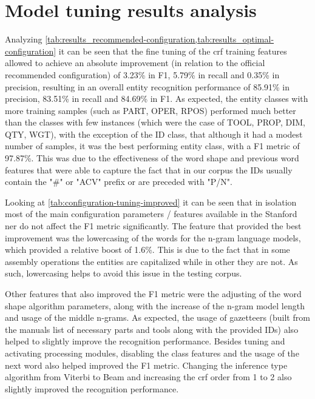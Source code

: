 \section{Model tuning results analysis}\label{sec:model-tuning-results}

Analyzing \cref{tab:results_recommended-configuration,tab:results_optimal-configuration} it can be seen that the fine tuning of the \gls{crf} training features allowed to achieve an absolute improvement (in relation to the official recommended configuration) of 3.23\% in F1, 5.79\% in recall and 0.35\% in precision, resulting in an overall entity recognition performance of 85.91\% in precision, 83.51\% in recall and 84.69\% in F1. As expected, the entity classes with more training samples (such as PART, OPER, RPOS) performed much better than the classes with few instances (which were the case of TOOL, PROP, DIM, QTY, WGT), with the exception of the ID class, that although it had a modest number of samples, it was the best performing entity class, with a F1 metric of 97.87\%. This was due to the effectiveness of the word shape and previous word features that were able to capture the fact that in our corpus the IDs usually contain the "\#" or "ACV" prefix or are preceded with "P/N".

Looking at \cref{tab:configuration-tuning-improved} it can be seen that in isolation most of the main configuration parameters / features available in the Stanford \gls{ner} do not affect the F1 metric significantly. The feature that provided the best improvement was the lowercasing of the words for the n-gram language models, which provided a relative boost of 1.6\%. This is due to the fact that in some assembly operations the entities are capitalized while in other they are not. As such, lowercasing helps to avoid this issue in the testing corpus.

Other features that also improved the F1 metric were the adjusting of the word shape algorithm parameters, along with the increase of the n-gram model length and usage of the middle n-grams. As expected, the usage of gazetteers (built from the manuals list of necessary parts and tools along with the provided IDs) also helped to slightly improve the recognition performance. Besides tuning and activating processing modules, disabling the class features and the usage of the next word also helped improved the F1 metric. Changing the inference type algorithm from Viterbi to Beam and increasing the \gls{crf} order from 1 to 2 also slightly improved the recognition performance.

